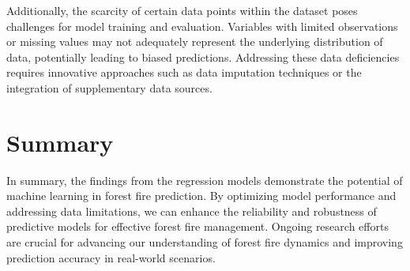 Additionally, the scarcity of certain data points within the dataset poses challenges for model training and evaluation. Variables with limited observations or missing values may not adequately represent the underlying distribution of data, potentially leading to biased predictions. Addressing these data deficiencies requires innovative approaches such as data imputation techniques or the integration of supplementary data sources.


\section{Summary}

In summary, the findings from the regression models demonstrate the potential of machine learning in forest fire prediction. By optimizing model performance and addressing data limitations, we can enhance the reliability and robustness of predictive models for effective forest fire management. Ongoing research efforts are crucial for advancing our understanding of forest fire dynamics and improving prediction accuracy in real-world scenarios.
